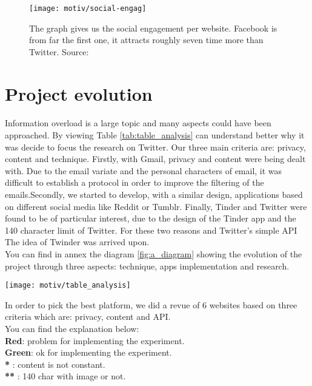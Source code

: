 \begin{figure}[h] 
\centering 
\texttt{[image: motiv/social-engag]} 
\caption[Social Media engagement]{The graph gives us the social engagement per website. Facebook is from far the first one, it attracts roughly seven time more than Twitter. Source: \cite{s_engag_stats}}
\label{fig:engagement} 
\end{figure}

\section{Project evolution}
\paragraph{}
Information overload is a large topic and many aspects could have been approached. By viewing Table \ref{tab:table_analysis} can understand better why it was decide to focus the research on Twitter. Our three main criteria are: privacy, content and technique. Firstly, with Gmail, privacy and content were being dealt with. Due to the email variate and the personal characters of email, it was difficult to establish a protocol in order to improve the filtering of the emails.Secondly, we started to develop, with a similar design, applications based on different social media like Reddit or Tumblr. Finally, Tinder and Twitter were found to be of particular interest, due to the design of the Tinder app and the 140 character limit of Twitter. For these two reasons and Twitter's simple API The idea of Twinder was arrived upon.\\
You can find in annex the diagram \ref{fig:a_diagram} showing the evolution of the project through three aspects: technique, apps implementation and research.\\

\begin{table}[tb] 
\centering 
\texttt{[image: motiv/table\_analysis]} 
\caption[Social Media comparison]{In order to pick the best platform, we did a revue of 6 websites based on three criteria which are: privacy, content and API. \\
You can find the explanation below: \\
\textbf{Red}: problem for implementing the experiment. \\
\textbf{Green}: ok for implementing the experiment. \\
\textbf{*} : content is not constant. \\
\textbf{**} : 140 char with image or not. \\
}
\label{tab:table_analysis} 
\end{table}


